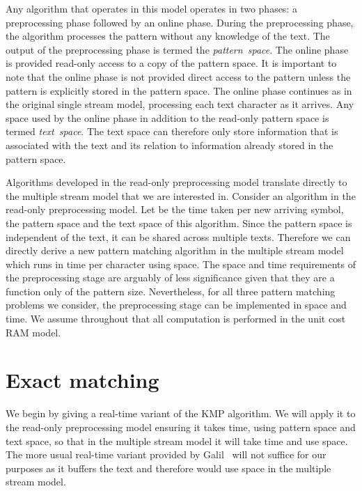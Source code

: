 \documentclass[envcountsame]{llncs}
\begin{document}
Any algorithm that operates in this model operates in two phases: a
preprocessing phase followed by an online phase. During the
preprocessing phase, the algorithm processes the pattern without any
knowledge of the text. The output of the preprocessing phase is termed
the \emph{pattern~space}.   The online phase
is provided read-only access to a copy of the pattern space. It is
important to note that the online phase is not provided direct access
to the pattern unless the pattern is explicitly stored in the pattern
space. The online phase continues as in the original single stream model, processing each text character as it arrives. Any space used by the online phase in addition to the read-only pattern space is termed \emph{text~space}. The text space can therefore only store information that is associated with the text and its relation to information already stored in the pattern space.

Algorithms developed in the read-only preprocessing model translate directly to the
multiple stream model that we are interested in. Consider an algorithm
in the read-only preprocessing model. Let  be the
time taken per new arriving symbol,  the pattern space
and  the text space of this algorithm. Since the pattern
space is independent of the text, it can be shared across multiple
texts. Therefore we can directly derive a new pattern matching
algorithm in the multiple stream model which runs in  time per
character using  space.  The space and
time requirements of the preprocessing stage are arguably of less
significance given that they are a function only of the pattern size.
Nevertheless, for all three pattern matching problems we consider,
the preprocessing stage can be implemented in  space and  time.
We assume throughout that all computation is performed in the unit cost RAM model.




\section{Exact matching}\label{sec:exact}

We begin by giving a real-time variant of the KMP algorithm. We will apply it to the read-only preprocessing model ensuring it takes
 time, using  pattern space and  text space,
so that in the multiple stream model it will take  time and use  space.
The more usual real-time variant provided by Galil~\cite{Galil:1981} will not suffice for our purposes as it buffers the text and therefore would use  space in the multiple stream model.
\end{document}
